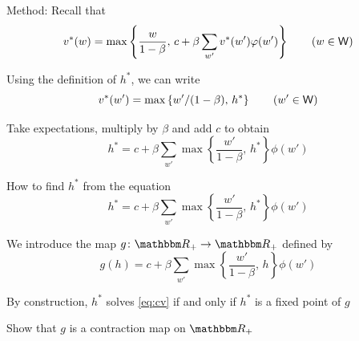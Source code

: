 \begin{frame}
    
    Method: Recall that 
    \begin{equation*}
        v^*(w) 
        = 
        \max 
        \left\{
            \frac{w}{1-\beta}
            ,\,
            c + \beta \sum_{w'} v^*(w') \varphi(w')
        \right\}
        \qquad (w \in \mathsf W)
    \end{equation*}

    Using the definition of $h^*$, we can write 
    \begin{equation*}
        v^*(w') = \max \left\{ w'/(1-\beta) ,\, h^* \right\}
        \qquad (w' \in \mathsf W)
    \end{equation*}

    Take expectations, multiply by $\beta$ and add $c$ to obtain
    \begin{equation*}
        h^*
        = 
        c + \beta 
        \sum_{w'} \max 
        \left\{
            \frac{w'}{1-\beta}
            ,\,
            h^*
        \right\} \phi(w')
    \end{equation*}

\end{frame}


\begin{frame}

    How to find $h^*$ from the equation
    \begin{equation}\label{eq:cv}
        h^*
        = 
        c + \beta 
        \sum_{w'} \max 
        \left\{
            \frac{w'}{1-\beta}
            ,\,
            h^*
        \right\} \phi(w')
    \end{equation}

    
    We introduce the map $g \colon \RR_+ \to \RR_+$ defined by
    \begin{equation*}
        g(h)
        = 
        c + \beta
        \sum_{w'} \max 
        \left\{
            \frac{w'}{1-\beta}
            ,\,
            h
        \right\} \phi(w')
    \end{equation*}

    By construction, $h^*$ solves \eqref{eq:cv} if and only if $h^*$ is a fixed
    point of $g$  

    \vspace{1em}
    \Ex Show that $g$ is a contraction map on $\RR_+$ 

\end{frame}

